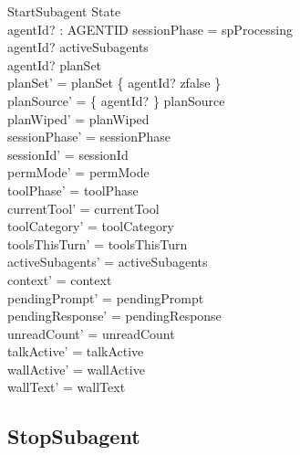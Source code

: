 \documentclass[a4paper,10pt,fleqn]{article}
\begin{document}
\begin{schema}{StartSubagent}
  \Delta State \\
  agentId? : AGENTID
  \where
  sessionPhase = spProcessing \\
  agentId? \in activeSubagents \\
  agentId? \notin \dom planSet \\
  planSet' = planSet \oplus \{ agentId? \mapsto zfalse \} \\
  planSource' = \{ agentId? \} \ndres planSource \\
  planWiped' = planWiped \\
  sessionPhase' = sessionPhase \\
  sessionId' = sessionId \\
  permMode' = permMode \\
  toolPhase' = toolPhase \\
  currentTool' = currentTool \\
  toolCategory' = toolCategory \\
  toolsThisTurn' = toolsThisTurn \\
  activeSubagents' = activeSubagents \\
  context' = context \\
  pendingPrompt' = pendingPrompt \\
  pendingResponse' = pendingResponse \\
  unreadCount' = unreadCount \\
  talkActive' = talkActive \\
  wallActive' = wallActive \\
  wallText' = wallText
\end{schema}

\subsection{StopSubagent}
\end{document}
